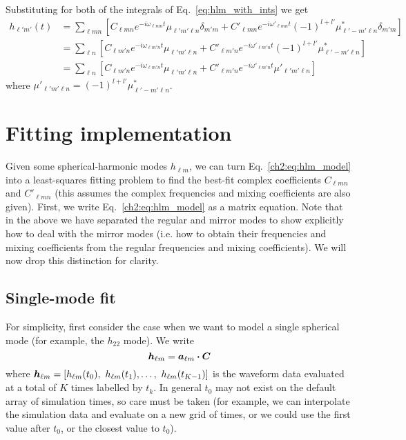 Substituting for both of the integrals of Eq.~\ref{eq:hlm_with_ints} we get
\begin{align}\label{ch2:eq:hlm_model}
    h_{\ell' m'}(t) &= \sum_{\ell m n} \left[ C_{\ell m n} e^{-i \omega_{\ell m n} t} \mu_{\ell' m' \ell n} \delta_{m' m} + C'_{\ell m n} e^{-i \omega'_{\ell m n} t} (-1)^{l+l'} \mu^*_{\ell' -m' \ell n} \delta_{m' m} \right] \nonumber \\
    &= \sum_{\ell n} \left[ C_{\ell m' n} e^{-i \omega_{\ell m' n} t} \mu_{\ell' m' \ell n} + C'_{\ell m' n} e^{-i \omega'_{\ell m' n} t} (-1)^{l+l'} \mu^*_{\ell' -m' \ell n} \right] \nonumber \\
    &= \sum_{\ell n} \left[ C_{\ell m' n} e^{-i \omega_{\ell m' n} t} \mu_{\ell' m' \ell n} + C'_{\ell m' n} e^{-i \omega'_{\ell m' n} t} \mu'_{\ell' m' \ell n} \right]
\end{align}
where $\mu'_{\ell' m' \ell n} = (-1)^{l+l'} \mu^*_{\ell' -m' \ell n}$.

\section{Fitting implementation}
\label{ch2:sec:fitting}

Given some spherical-harmonic modes $h_{\ell m}$, we can turn Eq.~\ref{ch2:eq:hlm_model} into a least-squares fitting problem to find the best-fit complex coefficients $C_{\ell m n}$ and $C'_{\ell m n}$ (this assumes the complex frequencies and mixing coefficients are also given). 
First, we write Eq.~\ref{ch2:eq:hlm_model} as a matrix equation. 
Note that in the above we have separated the regular and mirror modes to show explicitly how to deal with the mirror modes (i.e. how to obtain their frequencies and mixing coefficients from the regular frequencies and mixing coefficients). 
We will now drop this distinction for clarity.

\subsection{Single-mode fit}

For simplicity, first consider the case when we want to model a single spherical mode (for example, the $h_{22}$ mode). We write
\begin{equation}\label{eq:hlm_matrix_single}
    \vb*{h}_{\ell m} = \vb*{a}_{\ell m} \vdot \vb*{C}
\end{equation}
where $\vb*{h}_{\ell m} = \left[h_{\ell m}(t_0),\ h_{\ell m}(t_1), \ldots,\ h_{\ell m}(t_{K-1}) \right]$ is the waveform data evaluated at a total of $K$ times labelled by $t_k$. 
In general $t_0$ may not exist on the default array of simulation times, so care must be taken (for example, we can interpolate the simulation data and evaluate on a new grid of times, or we could use the first value after $t_0$, or the closest value to $t_0$). 

